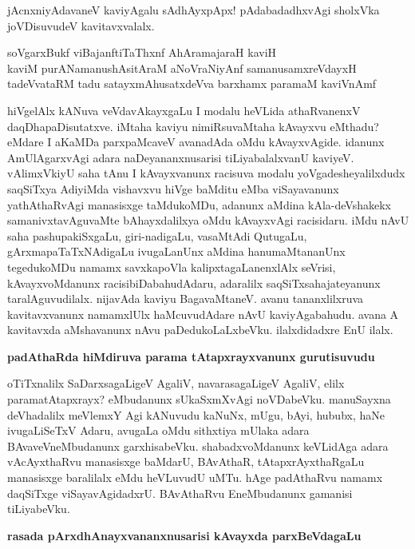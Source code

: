\noindent
jAcnxniyAdavaneV kaviyAgalu sAdhAyxpApx! pAdabadadhxvAgi sholxVka joVDisuvudeV kavitavxvalalx.

\begin{shloka}
soVgarxBukf viBajanftiTaThxnf AhAramajaraH kaviH\\\label{239b}
kaviM purANamanushAsitAraM aNoVraNiyAnf samanusamxreVdayxH\\
tadeVvataRM tadu satayxmAhusatxdeVva barxhamx paramaM kaviVnAmf\label{239c}
\end{shloka}                    

hiVgelAlx kANuva veVdavAkayxgaLu I modalu heVLida athaRvanenxV daqDhapaDisutatxve. iMtaha kaviyu nimiRsuvaMtaha kAvayxvu eMthadu? eMdare I aKaMDa parxpaMcaveV avanadAda oMdu kAvayxvAgide. idanunx AmUlAgarxvAgi adara naDeyananxnusarisi tiLiyabalalxvanU kaviyeV. vAlimxVkiyU saha tAnu I kAvayxvanunx racisuva modalu yoVgadesheyalilxdudx saqSiTxya AdiyiMda vishavxvu hiVge baMditu eMba viSayavanunx yathAthaRvAgi manasisxge taMdukoMDu, adanunx aMdina kAla-deVshakekx samanivxtavAguvaMte bAhayxdalilxya oMdu kAvayxvAgi racisidaru. iMdu nAvU saha pashupakiSxgaLu, giri-nadigaLu, vasaMtAdi QutugaLu, gArxmapaTaTxNAdigaLu ivugaLanUnx aMdina hanumaMtananUnx tegedukoMDu namamx savxkapoVla kalipxtagaLanenxlAlx seVrisi, kAvayxvoMdanunx racisibiDabahudAdaru, adaralilx saqSiTxsahajateyanunx taralAguvudilalx. nijavAda kaviyu BagavaMtaneV. avanu tananxlilxruva kavitavxvanunx namamxlUlx haMcuvudAdare nAvU kaviyAgabahudu. avana A kavitavxda aMshavanunx nAvu paDedukoLaLxbeVku. ilalxdidadxre EnU ilalx.

{\bigskip
\noindent
{\large\bf padAthaRda hiMdiruva parama tAtapxrayxvanunx gurutisuvudu}}\label{page240}
\medskip

\noindent
oTiTxnalilx SaDarxsagaLigeV AgaliV, navarasagaLigeV AgaliV, elilx paramatAtapxrayx? eMbudanunx sUkaSxmXvAgi noVDabeVku. manuSayxna deVhadalilx meVlemxY Agi kANuvudu kaNuNx, mUgu, bAyi, hububx, haNe ivugaLiSeTxV Adaru, avugaLa oMdu sithxtiya mUlaka adara BAvaveVneMbudanunx garxhisabeVku. shabadxvoMdanunx keVLidAga adara vAcAyxthaRvu manasisxge baMdarU, BAvAthaR, tAtapxrAyxthaRgaLu manasisxge baralilalx eMdu heVLuvudU uMTu. hAge padAthaRvu namamx daqSiTxge viSayavAgidadxrU. BAvAthaRvu EneMbudanunx gamanisi tiLiyabeVku.

{\medskip
\noindent
{\large\bf rasada pArxdhAnayxvananxnusarisi kAvayxda parxBeVdagaLu}}\label{page240a}
\smallskip

